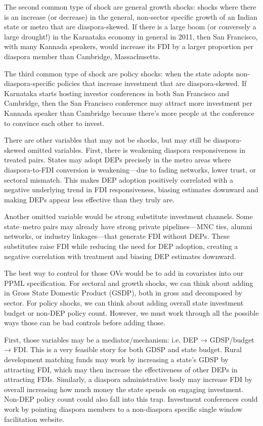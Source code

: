 \documentclass[12pt]{article}
\begin{document}
The second common type of shock are general growth shocks: shocks where there is an increase (or decrease) in the general, non-sector specific growth of an Indian state or metro that are diaspora-skewed. If there is a large boom (or conversely a large drought!) in the Karnataka economy in general in 2011, then San Francisco, with many Kannada speakers, would increase its FDI by a larger proportion per diaspora member than Cambridge, Massachusetts.

The third common type of shock are policy shocks: when the state adopts non-diaspora-specific policies that increase investment that are diaspora-skewed. If Karnataka starts hosting investor conferences in both San Francisco and Cambridge, then the San Francisco conference may attract more investment per Kannada speaker than Cambridge because there's more people at the conference to convince each other to invest.

There are other variables that may not be shocks, but may still be diaspora-skewed omitted variables. First, there is weakening diaspora responsiveness in treated pairs. States may adopt DEPs precisely in the metro areas where diaspora-to-FDI conversion is weakening—due to fading networks, lower trust, or sectoral mismatch. This makes DEP adoption positively correlated with a negative underlying trend in FDI responsiveness, biasing estimates downward and making DEPs appear less effective than they truly are.

Another omitted variable would be strong substitute investment channels. Some state–metro pairs may already have strong private pipelines—MNC ties, alumni networks, or industry linkages—that generate FDI without DEPs. These substitutes raise FDI while reducing the need for DEP adoption, creating a negative correlation with treatment and biasing DEP estimates downward.

The best way to control for those OVs would be to add in covariates into our PPML specification. For sectoral and growth shocks, we can think about adding in Gross State Domestic Product (GSDP), both in gross and decomposed by sector. For policy shocks, we can think about adding overall state investment budget or non-DEP policy count. However, we must work through all the possible ways those can be bad controls before adding those.

First, those variables may be a mediator/mechanism: i.e. DEP → GDSP/budget → FDI. This is a very feasible story for both GDSP and state budget. Rural development matching funds may work by increasing a state's GDSP by attracting FDI, which may then increase the effectiveness of other DEPs in attracting FDIs. Similarly, a diaspora administrative body may increase FDI by overall increasing how much money the state spends on engaging investment. Non-DEP policy count could also fall into this trap. Investment conferences could work by pointing diaspora members to a non-diaspora specific single window facilitation website.
\end{document}
